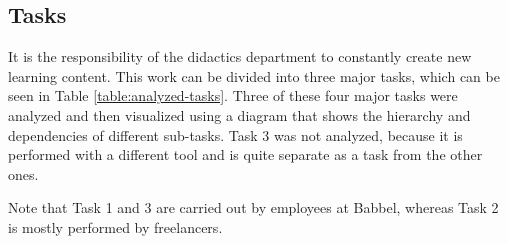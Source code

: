 

\subsection{Tasks} \label{tasks}
It is the responsibility of the didactics department to constantly create new learning content. This work can be divided into three major tasks, which can be seen in Table \ref{table:analyzed-tasks}. Three of these four major tasks were analyzed and then visualized using a diagram that shows the hierarchy and dependencies of different sub-tasks. Task 3 was not analyzed, because it is performed with a different tool and is quite separate as a task from the other ones.

Note that Task 1 and 3 are carried out by employees at Babbel, whereas Task 2 is mostly performed by freelancers.


